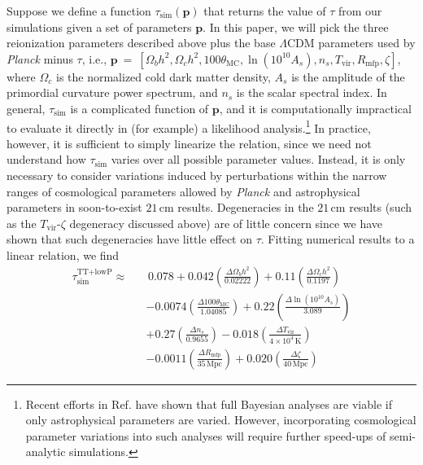 \documentclass[twocolumn,aps,prd,nofootinbib,showpacs]{revtex4-1}
\begin{document}
Suppose we define a function $\tau_\textrm{sim} (\mathbf{p})$ that returns the value of $\tau$ from our simulations given a set of parameters $\mathbf{p}$. In this paper, we will pick the three reionization parameters described above plus the base $\Lambda$CDM parameters used by \emph{Planck} minus $\tau$, i.e., $\mathbf{p}~=~\left[ \Omega_b h^2, \Omega_c h^2, 100\theta_\textrm{MC}, \ln ( 10^{10} A_s), n_s, T_\textrm{vir}, R_\textrm{mfp}, \zeta \right]$, where $\Omega_c$ is the normalized cold dark matter density, $A_s$ is the amplitude of the primordial curvature power spectrum, and $n_s$ is the scalar spectral index. In general, $\tau_\textrm{sim}$ is a complicated function of $\mathbf{p}$, and it is computationally impractical to evaluate it directly in (for example) a likelihood analysis.\footnote{Recent efforts in Ref. \cite{greig_and_mesinger2015} have shown that full Bayesian analyses are viable if only astrophysical parameters are varied. However, incorporating cosmological parameter variations into such analyses will require further speed-ups of semi-analytic simulations.}  In practice, however, it is sufficient to simply linearize the relation, since we need not understand how $\tau_\textrm{sim}$ varies over all possible parameter values. Instead, it is only necessary to consider variations induced by perturbations within the narrow ranges of cosmological parameters allowed by \emph{Planck} and astrophysical parameters in soon-to-exist $21\,\textrm{cm}$ results. Degeneracies in the $21\,\textrm{cm}$ results (such as the $T_\textrm{vir}$-$\zeta$ degeneracy discussed above) are of little concern since we have shown that such degeneracies have little effect on $\tau$. Fitting numerical results to a linear relation, we find
\begin{eqnarray}
\label{eq:TTlowP_linearTau}
\tau_\textrm{sim}^\textrm{TT+lowP} \approx &&\, 0.078 + 0.042 \left(\frac{\Delta\Omega_b h^2}{0.02222}\right) +  0.11\left(\frac{\Delta\Omega_c h^2}{0.1197}\right) \nonumber\\
&& -0.0074 \left(\frac{\Delta100\theta_\textrm{MC}}{1.04085}\right)  + 0.22  \left(\frac{\Delta\ln (10^{10} A_s)}{3.089}\right)\nonumber \\
&& + 0.27 \left(\frac{\Delta n_s}{0.9655}\right) -0.018\left(\frac{\Delta T_\textrm{vir}}{4 \times 10^4\,\textrm{K}}\right)\nonumber \\
&& -0.0011 \left(\frac{\Delta R_\textrm{mfp}}{35\,\textrm{Mpc}}\right) + 0.020 \left(\frac{\Delta \zeta}{40\,\textrm{Mpc}}\right)
\end{eqnarray}
\end{document}
